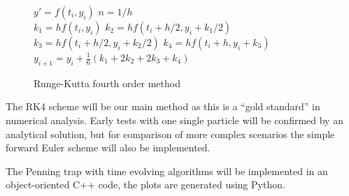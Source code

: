 \documentclass[english,notitlepage,reprint,nofootinbib]{revtex4-1}  %
\begin{document}
\begin{figure}[H]
    \begin{algorithm}[H]
        \caption{Runge-Kutta fourth order method}
        \label{algo:RK4}
        \begin{algorithmic}
            \State $y' = f(t_i,y_i)$        
            \State $n = 1 / h$ 
            \\
            \State $k_1 = hf(t_i,y_i)$  
            \State $k_2 = hf(t_i + h/2, y_i +k_1/2)$  
            \State $k_3 = hf(t_i + h/2, y_i + k_2/2)$ 
            \State $k_4 = hf(t_i + h, y_i + k_3)$ 
            \State $y_{i+1} = y_i + \frac{1}{6}(k_1 + 2k_2 + 2k_3 + k_4)$ 
            \EndFor
            \EndProcedure
        \end{algorithmic}
    \end{algorithm}
\end{figure}

The RK4 scheme will be our main method as this is a ``gold standard'' in numerical analysis.
Early tests with one single particle will be confirmed by an analytical solution, but for comparison of more complex
scenarios the simple forward Euler scheme will also be implemented.

The Penning trap with time evolving algorithms will be implemented in an object-oriented C++ code, the plots are generated using Python.
\end{document}

